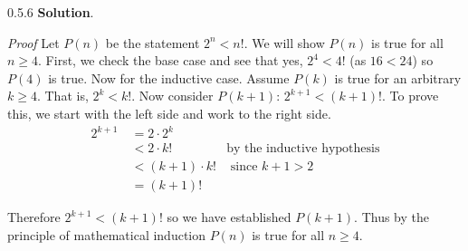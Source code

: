 \documentclass[11pt,]{book}
\makeatletter
\theoremstyle{ptxplainnotitle}
\theoremstyle{ptxplaintitle}
\renewcommand*{\proofname}{Proof}
\renewenvironment{proof}[1][\proofname]{\par
  \pushQED{\qed}%
  \normalfont \topsep6\p@\@plus6\p@\relax
  \trivlist
  \item\relax
    {\itshape
    #1\@addpunct{.}}\hspace\labelsep\ignorespaces
}{%
  \popQED\endtrivlist\@endpefalse
}
\theoremstyle{ptxdefinitionnotitle}
\theoremstyle{ptxdefinitiontitle}
\theoremstyle{ptxdefinitionnotitle}
\theoremstyle{ptxdefinitiontitle}
\theoremstyle{ptxdefinitionnotitle}
\theoremstyle{ptxdefinitiontitle}
\theoremstyle{ptxdefinitiontitlenonumber}
\theoremstyle{ptxdefinitiontitlenonumber}
\numberwithin{equation}{chapter}
\newcommand{\lt}{<}
\newcommand{\gt}{>}
\newcommand{\amp}{&}
\makeatother
\begin{document}
\begin{divisionexercise}{0.5.6}
\textbf{Solution}.\quad%
\begin{proof}\hypertarget{proof-9}{}
\hypertarget{p-621}{}%
Let \(P(n)\) be the statement \(2^n \lt  n!\). We will show \(P(n)\) is true for all \(n \ge 4\). First, we check the base case and see that yes, \(2^4 \lt  4!\) (as \(16 \lt  24\)) so \(P(4)\) is true. Now for the inductive case. Assume \(P(k)\) is true for an arbitrary \(k \ge 4\). That is, \(2^k \lt  k!\). Now consider \(P(k+1)\): \(2^{k+1} \lt  (k+1)!\). To prove this, we start with the left side and work to the right side.%
\begin{align*}
2^{k+1}~ \amp = 2\cdot 2^k \amp\\
\amp \lt 2\cdot k! \amp \text{by the inductive hypothesis}\\
\amp \lt (k+1) \cdot k! \amp \text{ since } k+1 \gt 2\\
\amp = (k+1)! \amp
\end{align*}
%
\par
\hypertarget{p-622}{}%
Therefore \(2^{k+1} \lt  (k+1)!\) so we have established \(P(k+1)\). Thus by the principle of mathematical induction \(P(n)\) is true for all \(n \ge 4\).%
\end{proof}
\end{divisionexercise}%
\end{document}
